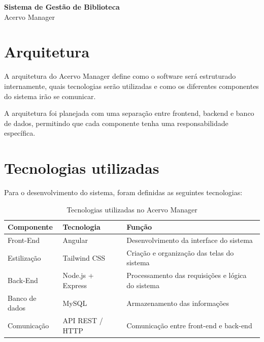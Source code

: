 \documentclass[12pt,a4paper]{article}
\begin{document}
\begin{center}
    {\LARGE \textbf{Sistema de Gestão de Biblioteca}}\\[0.3cm]
    {\Large Acervo Manager}
\end{center}

\vspace{1cm}

\section{Arquitetura}

A arquitetura do Acervo Manager define como o software será estruturado internamente, quais tecnologias serão utilizadas e como os diferentes componentes do sistema irão se comunicar.

A arquitetura foi planejada com uma separação entre frontend, backend e banco de dados, permitindo que cada componente tenha uma responsabilidade específica.

\section{Tecnologias utilizadas}

Para o desenvolvimento do sistema, foram definidas as seguintes tecnologias:

\begin{table}[h!]
    \centering
    \renewcommand{\arraystretch}{1.4}
    \begin{tabular}{|p{3.5cm}|p{4cm}|p{6cm}|}
        \hline
        \textbf{Componente} & \textbf{Tecnologia} & \textbf{Função} \\
        \hline
        Front-End & Angular & Desenvolvimento da interface do sistema \\
        \hline
        Estilização & Tailwind CSS & Criação e organização das telas do sistema \\
        \hline
        Back-End & Node.js + Express & Processamento das requisições e lógica do sistema \\
        \hline
        Banco de dados & MySQL & Armazenamento das informações \\
        \hline
        Comunicação & API REST / HTTP & Comunicação entre front-end e back-end \\
        \hline
    \end{tabular}
    \caption{Tecnologias utilizadas no Acervo Manager}
    \label{tab:tecnologias}
\end{table}
\end{document}
